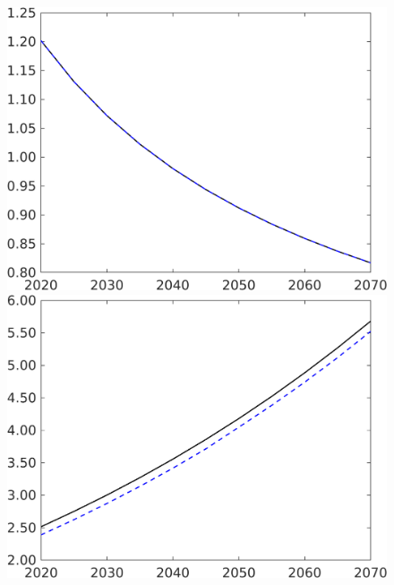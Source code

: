 \begin{figure}[h!!]
\begin{minipage}[]{0.32\textwidth}
	\end{minipage}
	\begin{minipage}[]{0.32\textwidth}
		\includegraphics[width=1\textwidth]{../../codding_model/own_basedOnFried/optimalPol_190722_tidiedUp/figures/all_10Aout22/CountTaul_modnsk_target_sgsff_spillover0_sep1_extern0_PV1_etaa0.79_lgd0.png}
	\end{minipage}
	\begin{minipage}[]{0.32\textwidth}
		\includegraphics[width=1\textwidth]{../../codding_model/own_basedOnFried/optimalPol_190722_tidiedUp/figures/all_10Aout22/CountTaul_modnsk_target_Y_spillover0_sep1_extern0_PV1_etaa0.79_lgd0.png}

\end{minipage}
\end{figure}
